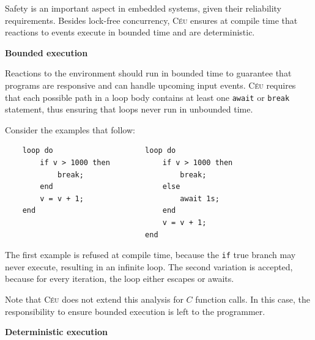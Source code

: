 \documentclass{sig-alternate}
\newcommand{\2}{\;\;}
\newcommand{\5}{\;\;\;\;\;}
\newcommand{\CEU}{\textsc{C\'{e}u}}
\newcommand{\code}[1] {{\small{\texttt{#1}}}}
\begin{document}
Safety is an important aspect in embedded systems, given their reliability 
requirements.
Besides lock-free concurrency, \CEU{} ensures at compile time that reactions to 
events execute in bounded time and are deterministic.%

\textbf{Bounded execution}

Reactions to the environment should run in bounded time to guarantee that 
programs are responsive and can handle upcoming input events.
\CEU{} requires that each possible path in a loop body contains at least one 
\code{await} or \code{break} statement, thus ensuring that loops never run in 
unbounded time.

Consider the examples that follow:

{\small
\begin{verbatim}
    loop do                     loop do
        if v > 1000 then            if v > 1000 then
            break;                      break;
        end                         else
        v = v + 1;                      await 1s;
    end                             end
                                    v = v + 1;
                                end
\end{verbatim}
}

The first example is refused at compile time, because the \code{if} true branch 
may never execute, resulting in an infinite loop.
The second variation is accepted, because for every iteration, the loop either 
escapes or awaits.

Note that \CEU{} does not extend this analysis for $C$ function calls.
In this case, the responsibility to ensure bounded execution is left to the 
programmer.

\textbf{Deterministic execution}
\end{document}
